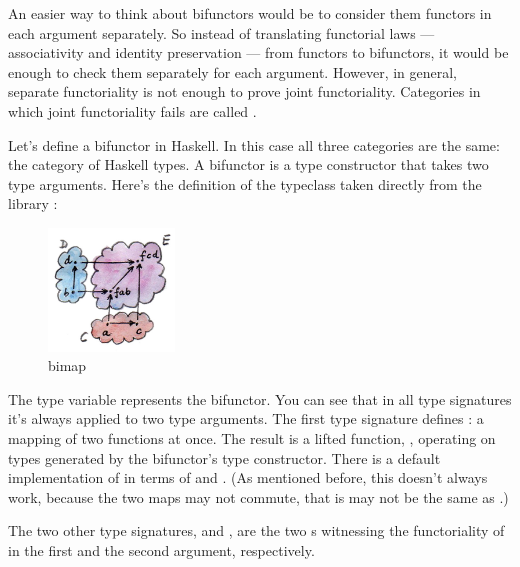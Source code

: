 An easier way to think about bifunctors would be to consider them functors in
each argument separately. So instead of translating functorial laws ---
associativity and identity preservation --- from functors to bifunctors,
it would be enough to check them separately for each argument. However, in general,
separate functoriality is not enough to prove joint functoriality. Categories in which
joint functoriality fails are called .

Let's define a bifunctor in Haskell. In this case all three categories
are the same: the category of Haskell types. A bifunctor is a type
constructor that takes two type arguments. Here's the definition of the
 typeclass taken directly from the library
:


\begin{figure}[H]
\centering\includegraphics[width=0.3\textwidth]{images/bimap.jpg}
\caption{bimap}
\end{figure}

The type variable  represents the bifunctor. You can see that
in all type signatures it's always applied to two type arguments. The
first type signature defines : a mapping of two functions
at once. The result is a lifted function,
, operating on types
generated by the bifunctor's type constructor. There is a default
implementation of  in terms of  and
. (As mentioned before, this doesn't always work, because
the two maps may not commute, that is  may not
be the same as .)


\noindent
The two other type signatures,  and , are
the two s witnessing the functoriality of  in the
first and the second argument, respectively.

